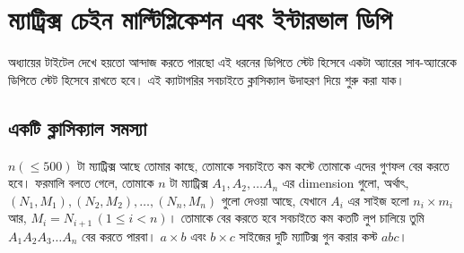 
\chapter{ম্যাট্রিক্স চেইন মাল্টিপ্লিকেশন এবং ইন্টারভাল ডিপি}

অধ্যায়ের টাইটেল দেখে হয়তো আন্দাজ করতে পারছো এই ধরনের ডিপিতে স্টেট হিসেবে একটা
অ্যারের সাব-অ্যারেকে ডিপিতে স্টেট হিসেবে রাখতে হবে। এই ক্যাটাগরির সবচাইতে
ক্লাসিক্যাল উদাহরণ দিয়ে শুরু করা যাক।

\section{একটি ক্লাসিক্যাল সমস্যা}

\begin{example}[ম্যাট্রিক্স চেইন মাল্টিপ্লিকেশন]
  $n (\le 500)$ টা ম্যাট্রিক্স আছে তোমার কাছে, তোমাকে সবচাইতে কম কস্টে তোমাকে
  এদের গুণফল বের করতে হবে। ফরমালি বলতে গেলে, তোমাকে $n$ টা ম্যাট্রিক্স $A_1,
  A_2,
  \ldots A_n$ এর dimension গুলো, অর্থাৎ, $(N_1, M_1), (N_2, M_2), \ldots,
  (N_n, M_n)$ গুলো দেওয়া আছে, যেখানে $A_i$ এর সাইজ হলো $n_i \times m_i$ আর,
  $M_i = N_{i+1} \, (1 \le i < n)$। তোমাকে বের করতে হবে সবচাইতে কম কতটি লুপ
  চালিয়ে তুমি $A_1 A_2 A_3 \dots A_n$ বের করতে পারবা। $a \times b$ এবং $b
  \times c$ সাইজের দুটি ম্যাটিক্স গুন করার কস্ট $abc$।
\end{example}

